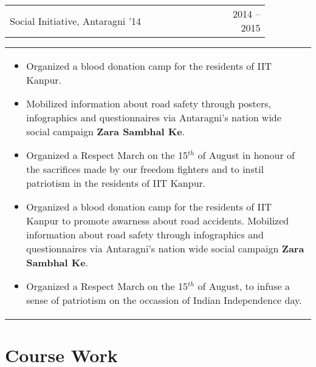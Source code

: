 \documentclass[a4paper,10pt]{article} %
\newcommand{\iproject}[3]{
    \begin{tabular}{p{0.85\linewidth}r}
        \textcolor{NavyBlue}{#2} & \multicolumn{1}{m{3cm}}{\raggedleft \textsc{#1}}\\
    \end{tabular}
    \begin{tabular}{p{\linewidth}}
    \vspace{-0.3cm}
        \footnotesize{#3}
    \end{tabular}
    \vspace{-0.5cm}
}
\begin{document}
\iproject {2014 -- 2015}
          {Social Initiative, Antaragni '14}
          {
               \begin{itemize}[leftmargin=0.5cm]
                   \item Organized a blood donation camp for the residents of IIT Kanpur.
                   \item Mobilized information about road safety through posters, infographics and questionnaires
                       via Antaragni's nation wide social campaign \textbf{Zara Sambhal Ke}.
                   \item Organized a Respect March on the 15$^{th}$ of August in honour of the sacrifices made by our
                       freedom fighters and to instil patriotism in the residents of IIT Kanpur.
                   \item Organized a blood donation camp for the residents of IIT Kanpur to promote awarness
                       about road accidents.  Mobilized information about road safety through infographics and questionnaires
                       via Antaragni's nation wide social campaign \textbf{Zara Sambhal Ke}.
                   \item Organized a Respect March on the 15$^{th}$ of August, to infuse a sense of patriotism
                       on the occassion of Indian Independence day.
               \end{itemize}
          }


\section{Course Work}
\end{document}
